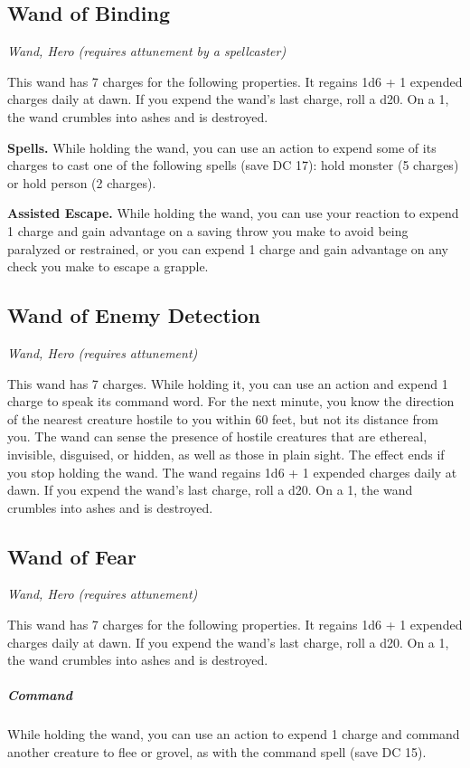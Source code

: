 \subsection{Wand of Binding}
\textit{Wand, Hero (requires attunement by a spellcaster)} 

This wand has 7 charges for the following properties. It regains 1d6 + 1 expended charges daily at dawn. If you expend the wand's last charge, roll a d20. On a 1, the wand crumbles into ashes and is destroyed.

\textbf{Spells.} While holding the wand, you can use an action to expend some of its charges to cast one of the following spells (save DC 17): hold monster (5 charges) or hold person (2 charges).

\textbf{Assisted Escape.} While holding the wand, you can use your reaction to expend 1 charge and gain advantage on a saving throw you make to avoid being paralyzed or restrained, or you can expend 1 charge and gain advantage on any check you make to escape a grapple.

\subsection{Wand of Enemy Detection}
\textit{Wand, Hero (requires attunement)}

This wand has 7 charges. While holding it, you can use an action and expend 1 charge to speak its command word. For the next minute, you know the direction of the nearest creature hostile to you within 60 feet,
but not its distance from you. The wand can sense the presence of hostile creatures that are ethereal, invisible, disguised, or hidden, as well as those in plain sight. The effect ends if you stop holding the wand.
The wand regains 1d6 + 1 expended charges daily at dawn. If you expend the wand's last charge, roll a d20. On a 1, the wand crumbles into ashes and is destroyed.

\subsection{Wand of Fear}
\textit{Wand, Hero (requires attunement)}

This wand has 7 charges for the following properties. It regains 1d6 + 1 expended charges daily at dawn. If you expend the wand's last charge, roll a d20. On a 1, the wand crumbles into ashes and is destroyed.

\subparagraph*{Command} While holding the wand, you can use an action to expend 1 charge and command another creature to flee or grovel, as with the command spell (save DC 15).

